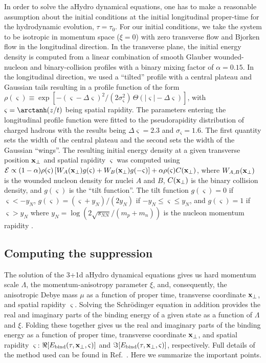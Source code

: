 In order to solve the aHydro dynamical equations, one has to make a reasonable assumption about the initial conditions at the initial longitudinal proper-time for the hydrodynamic evolution, $\tau = \tau_0$.  For our initial conditions, we take the system to be isotropic in momentum space ($\xi=0$) with zero transverse flow and Bjorken flow in the longitudinal direction.  In the transverse plane, the initial energy density is computed from a linear combination of smooth Glauber wounded-nucleon and binary-collision profiles with a binary mixing factor of $\alpha = 0.15$.  In the longitudinal direction, we used a ``tilted'' profile with a central plateau and Gaussian tails resulting in a profile function of the form $\rho(\varsigma) \equiv \exp \left[ - (\varsigma - \Delta \varsigma)^2/(2 \sigma_\varsigma^2) \, \Theta (|\varsigma| - \Delta \varsigma) \right]$, with \mbox{$\varsigma = \arctanh(z/t)$} being spatial rapidity.  The parameters entering the longitudinal profile function were fitted to the pseudorapidity distribution of charged hadrons with the results being $\Delta\varsigma = 2.3$ and $\sigma_{\varsigma} = 1.6$.  The first quantity sets the width of the central plateau and the second sets the width of the Gaussian ``wings''.  The resulting initial energy density at a given transverse position ${\bf x}_\perp$ and spatial rapidity $\varsigma$ was computed using ${\cal E} \propto (1-\alpha) \rho(\varsigma) \left[ W_A({\bf x}_\perp) g(\varsigma) + W_B({\bf x}_\perp) g(-\varsigma)\right] + \alpha \rho(\varsigma) C({\bf x}_\perp)$, where $W_{A,B}({\bf x}_\perp)$ is the wounded nucleon density for nuclei $A$ and $B$, $C({\bf x}_\perp)$ is the binary collision density, and $g(\varsigma)$ is the ``tilt function''.  The tilt function $g(\varsigma) = 0$ if $\varsigma < -y_N$, $g(\varsigma) = (\varsigma+y_N)/(2y_N)$ if $-y_N \leq \varsigma \leq y_N$, and $g(\varsigma)=1$ if $\varsigma > y_N$ where $y_N = \log(2\sqrt{s_{NN}}/(m_p + m_n))$ is the nucleon momentum rapidity \cite{Bozek:2010bi}.

\subsection{Computing the suppression}
\label{ssec:sup}

The solution of the 3+1d aHydro dynamical equations gives us hard momentum scale $\Lambda$, the momentum-anisotropy parameter $\xi$, and, consequently, the anisotropic Debye mass $\mu$ as a function of proper time, transverse coordinate 
${\bf x}_\perp$, and spatial rapidity $\varsigma$.  Solving the Schr\"odinger equation in addition provides the real and 
imaginary parts of the binding energy of a given state as a function of $\Lambda$ and $\xi$.  Folding these together 
gives us the real and imaginary parts of the binding energy 
as a function of proper time, transverse coordinate ${\bf x}_\perp$, and 
spatial rapidity $\varsigma$: $\Re[E_{\rm bind}(\tau,{\bf x}_\perp,\varsigma)]$ and 
$\Im[E_{\rm bind}(\tau,{\bf x}_\perp,\varsigma)]$, respectively.  Full details of the method used can be found in Ref.~\cite{Strickland:2011aa}.  Here we summarize the important points.


